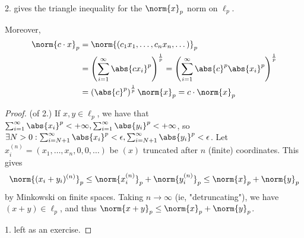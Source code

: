 \begin{remark}
    2. gives the triangle inequality for the $\norm{x}_p$ norm on $\ell_p$.

    Moreover,
    \begin{align*}
        \norm{c \cdot x}_p &= \norm{(c_1x_1, \dots, c_n x_n, \dots)}_p\\
        &= \left(\sum_{i=1}^\infty \abs{cx_i}^p\right)^\frac{1}{p} = \left(\sum_{i=1}^\infty\abs{c}^p \abs{x_i}^p \right)^\frac{1}{p}\\
        &= \left(\abs{c}^p\right)^\frac{1}{p}\norm{x}_p = c \cdot \norm{x}_p
    \end{align*}
\end{remark}
\begin{proof}
    (of 2.) If $x, y \in \ell_p$, we have that $\sum_{i=1}^\infty \abs{x_i}^p < + \infty, \sum_{i=1}^\infty \abs{y_i}^p < + \infty$, so $\exists N > 0 : \sum_{i=N+1}^\infty \abs{x_i}^p < \epsilon, \sum_{i=N+1}^\infty \abs{y_i}^p < \epsilon$. Let $x_i^{(n)} = (x_1, \dots, x_n, 0, 0, \dots)$ be $(x)$ truncated after $n$ (finite) coordinates. This gives \begin{align*}
        \norm{(x_i+y_i)^{(n)}}_p \leq \norm{x_i^{(n)}}_p + \norm{y_i^{(n)}}_p \leq \norm{x}_p + \norm{y}_p
    \end{align*}
    by Minkowski on finite spaces. Taking $n \to \infty$ (ie, "detruncating"), we have $(x + y) \in \ell_p$, and thus $\norm{x+y}_p \leq \norm{x}_p + \norm{y}_p$. 

    1. left as an exercise.
\end{proof}

